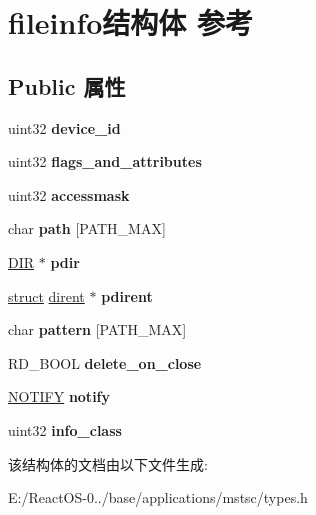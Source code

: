 \hypertarget{structfileinfo}{}\section{fileinfo结构体 参考}
\label{structfileinfo}
\subsection*{Public 属性}
\begin{DoxyCompactItemize}
\item 
\mbox{\label{structfileinfo_a38702bc1168a52f83ff6f89b0141d802}} 
uint32 {\bfseries device\+\_\+id}
\item 
\mbox{\label{structfileinfo_a8531baf6d1ad24204002e113ce196af8}} 
uint32 {\bfseries flags\+\_\+and\+\_\+attributes}
\item 
\mbox{\label{structfileinfo_a759fc3edf4e536d177f7df948810159b}} 
uint32 {\bfseries accessmask}
\item 
\mbox{\label{structfileinfo_af6b23bf4420bb0c34b9ad1045b7a9140}} 
char {\bfseries path} \mbox{[}P\+A\+T\+H\+\_\+\+M\+AX\mbox{]}
\item 
\mbox{\label{structfileinfo_abd2223c4a2cada3adb155259589a9a70}} 
\hyperlink{struct_d_i_r}{D\+IR} $\ast$ {\bfseries pdir}
\item 
\mbox{\label{structfileinfo_a44ee9e1ef91014929704e28f07fba8d8}} 
\hyperlink{interfacestruct}{struct} \hyperlink{structdirent}{dirent} $\ast$ {\bfseries pdirent}
\item 
\mbox{\label{structfileinfo_adc6b57a31238248c57042d21aa2ec3ee}} 
char {\bfseries pattern} \mbox{[}P\+A\+T\+H\+\_\+\+M\+AX\mbox{]}
\item 
\mbox{\label{structfileinfo_a39d99c78a40a9f66d8c04b84c16a611e}} 
R\+D\+\_\+\+B\+O\+OL {\bfseries delete\+\_\+on\+\_\+close}
\item 
\mbox{\label{structfileinfo_a7482f0da4702633069fb0b230d8798be}} 
\hyperlink{structnotify__data}{N\+O\+T\+I\+FY} {\bfseries notify}
\item 
\mbox{\label{structfileinfo_a3748eacc1efc403d55573faf83e52405}} 
uint32 {\bfseries info\+\_\+class}
\end{DoxyCompactItemize}


该结构体的文档由以下文件生成\+:\begin{DoxyCompactItemize}
\item 
E\+:/\+React\+O\+S-\/0../base/applications/mstsc/types.\+h\end{DoxyCompactItemize}
